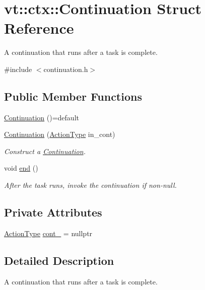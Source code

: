 \hypertarget{structvt_1_1ctx_1_1_continuation}{}\section{vt\+:\+:ctx\+:\+:Continuation Struct Reference}
\label{structvt_1_1ctx_1_1_continuation}


A continuation that runs after a task is complete.  




{\ttfamily \#include $<$continuation.\+h$>$}

\subsection*{Public Member Functions}
\begin{DoxyCompactItemize}
\item 
\hyperlink{structvt_1_1ctx_1_1_continuation_a161c480097907c7cc11f112ea6130a39}{Continuation} ()=default
\item 
\hyperlink{structvt_1_1ctx_1_1_continuation_ad18f8613f142fa3ed0e08f9d8df4e05a}{Continuation} (\hyperlink{namespacevt_ae0a5a7b18cc99d7b732cb4d44f46b0f3}{Action\+Type} in\+\_\+cont)
\begin{DoxyCompactList}\small\item\em Construct a {\ttfamily \hyperlink{structvt_1_1ctx_1_1_continuation}{Continuation}}. \end{DoxyCompactList}\item 
void \hyperlink{structvt_1_1ctx_1_1_continuation_abcfde5b28c25935a54d42a2aa5ba7de1}{end} ()
\begin{DoxyCompactList}\small\item\em After the task runs, invoke the continuation if non-\/null. \end{DoxyCompactList}\end{DoxyCompactItemize}
\subsection*{Private Attributes}
\begin{DoxyCompactItemize}
\item 
\hyperlink{namespacevt_ae0a5a7b18cc99d7b732cb4d44f46b0f3}{Action\+Type} \hyperlink{structvt_1_1ctx_1_1_continuation_aadaa0a147af8e8bba30684a098a5eb39}{cont\+\_\+} = nullptr
\end{DoxyCompactItemize}


\subsection{Detailed Description}
A continuation that runs after a task is complete. 

